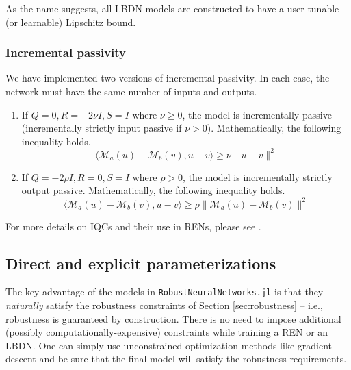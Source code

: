 As the name suggests, all LBDN models are constructed to have a user-tunable (or learnable) Lipschitz bound.

\subsubsection{Incremental passivity} 
We have implemented two versions of incremental passivity. In each case, the network must have the same number of inputs and outputs.

\begin{enumerate}
    \item If $Q = 0, R = -2\nu I, S = I$ where $\nu \ge 0$, the model is incrementally passive (incrementally strictly input passive if $\nu > 0$). Mathematically, the following inequality holds.
    \begin{equation}
    \langle \mathcal{M}_a(u) - \mathcal{M}_b(v), u-v \rangle \ge \nu \| u-v\|^2
    \end{equation}
    \item If $Q = -2\rho I, R = 0, S = I$ where $\rho > 0$, the model is incrementally strictly output passive. Mathematically, the following inequality holds.
    \begin{equation}
    \langle \mathcal{M}_a(u) - \mathcal{M}_b(v), u-v \rangle \ge \rho \| \mathcal{M}_a(u) - \mathcal{M}_b(v)\|^2
    \end{equation}
\end{enumerate}

For more details on IQCs and their use in RENs, please see \cite{Revay++2021b}.

\subsection{Direct and explicit parameterizations} \label{sec:parameterizations}

The key advantage of the models in \verb|RobustNeuralNetworks.jl| is that they \textit{naturally} satisfy the robustness constraints of Section \ref{sec:robustness} -- i.e., robustness is guaranteed by construction. There is no need to impose additional (possibly computationally-expensive) constraints while training a REN or an LBDN. One can simply use unconstrained optimization methods like gradient descent and be sure that the final model will satisfy the robustness requirements.


